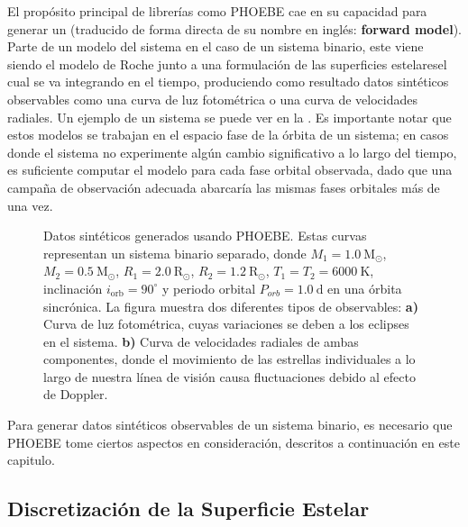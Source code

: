 El propósito principal de librerías como PHOEBE cae en su capacidad para generar
un  (traducido de forma directa de su nombre
en inglés: \textbf{forward model}). Parte de un modelo del sistema\textemdash
en el caso de un sistema binario, este viene siendo el modelo de Roche junto a
una formulación de las superficies estelares\textemdash el cual se va integrando
en el tiempo, produciendo como resultado datos sintéticos observables como una
curva de luz fotométrica o una curva de velocidades radiales. Un ejemplo de un
sistema  se puede ver en la
. Es importante notar que estos
modelos se trabajan en el espacio fase de la órbita de un sistema; en casos
donde el sistema no experimente algún cambio significativo a lo largo del
tiempo, es suficiente computar el modelo para cada fase orbital observada, dado
que una campaña de observación adecuada abarcaría las mismas fases orbitales más
de una vez.

\begin{figure}[!ht]
	\centering
	\caption{Datos sintéticos generados usando PHOEBE. Estas curvas representan
	un sistema binario separado, donde $M_1 = 1.0 \ \mathrm{M}_{\odot}$, $M_2 =
	0.5 \ \mathrm{M}_{\odot}$, $R_1 = 2.0 \ \mathrm{R}_{\odot}$, $R_2 = 1.2 \
	\mathrm{R}_{\odot}$, $T_1 = T_2 = 6000 \ \mathrm{K}$, inclinación
	$i_{\mathrm{orb}} = 90^{\circ}$ y periodo orbital $P_{orb} = 1.0 \
	\mathrm{d}$ en una órbita sincrónica. La figura muestra dos diferentes tipos
	de observables: \textbf{a)} Curva de luz fotométrica, cuyas variaciones se
	deben a los eclipses en el sistema. \textbf{b)} Curva de velocidades
	radiales de ambas componentes, donde el movimiento de las estrellas
	individuales a lo largo de nuestra línea de visión causa fluctuaciones
	debido al efecto de Doppler.} 
	\label{figuraPhoebeObservablesSinteticos}
\end{figure}

Para generar datos sintéticos observables de un sistema binario, es necesario
que PHOEBE tome ciertos aspectos en consideración, descritos a continuación en
este capitulo.

\subsection{Discretización de la Superficie Estelar}

